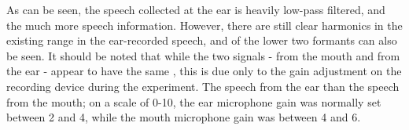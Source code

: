 \DIFdelend As can be seen, the speech collected at the ear is heavily low-pass filtered, and the \DIFdelbegin {}\DIFdelend \DIFaddbegin {}\DIFaddend much more speech information. However, there are still clear harmonics in the existing range in the ear-recorded speech, and \DIFdelbegin {}\DIFdelend \DIFaddbegin {}\DIFaddend of the lower two formants can also be seen.  It should be noted that while the two signals - from the mouth and from the ear - appear to have the same \DIFdelbegin {}\DIFdelend \DIFaddbegin {}\DIFaddend , this is due only to the gain adjustment on the recording device during the experiment.  The speech from the ear \DIFdelbegin {}\textit{} %
\DIFdelend \DIFaddbegin {}\DIFaddend than the speech from the mouth; on a scale of 0-10, the ear microphone gain was normally set \DIFdelbegin {}\DIFdelend between 2 and 4, while the mouth microphone gain was \DIFdelbegin {}\DIFdelend \DIFaddbegin {}\DIFaddend between 4 and 6.

